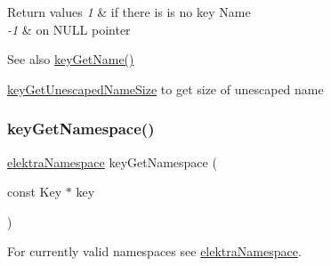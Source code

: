 \begin{DoxyRetVals}{Return values}
{\em 1} & if there is is no key Name \\
\hline
{\em -\/1} & on N\+U\+LL pointer \\
\hline
\end{DoxyRetVals}
\begin{DoxySeeAlso}{See also}
\hyperlink{group__keyname_gab29a850168d9b31c9529e90cf9ab68be}{key\+Get\+Name()} 

\hyperlink{group__keyname_ga5e7eff0c77678420199d0d2e8729152b}{key\+Get\+Unescaped\+Name\+Size} to get size of unescaped name 
\end{DoxySeeAlso}
\mbox{\label{group__keyname_gafc3ca03ed10f87eb59bdc02cf2a0de8d}} 
\subsubsection{\texorpdfstring{key\+Get\+Namespace()}{keyGetNamespace()}}
{\footnotesize\ttfamily \hyperlink{group__key_gaec3b8d6f430ae49b91bafe8a86310a68}{elektra\+Namespace} key\+Get\+Namespace (\begin{DoxyParamCaption}\item[{const Key $\ast$}]{key }\end{DoxyParamCaption})}



For currently valid namespaces see \hyperlink{group__key_gaec3b8d6f430ae49b91bafe8a86310a68}{elektra\+Namespace}. 

